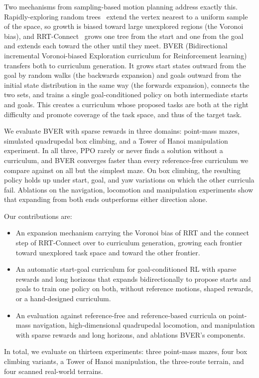 Two mechanisms from sampling-based motion planning address exactly this. Rapidly-exploring random trees~\citep[RRT;][]{lavalle2001randomized} extend the vertex nearest to a uniform sample of the space, so growth is biased toward large unexplored regions (the Voronoi bias), and RRT-Connect~\citep{kuffner2000rrt} grows one tree from the start and one from the goal and extends each toward the other until they meet. BVER (Bidirectional incremental Voronoi-biased Exploration curriculum for Reinforcement learning) transfers both to curriculum generation. It grows start states outward from the goal by random walks (the backwards expansion) and goals outward from the initial state distribution in the same way (the forwards expansion), connects the two sets, and trains a single goal-conditioned policy on both intermediate starts and goals. This creates a curriculum whose proposed tasks are both at the right difficulty and promote coverage of the task space, and thus of the target task.

We evaluate BVER with sparse rewards in three domains: point-mass mazes, simulated quadrupedal box climbing, and a Tower of Hanoi manipulation experiment. In all three, PPO rarely or never finds a solution without a curriculum, and BVER converges faster than every reference-free curriculum we compare against on all but the simplest maze. On box climbing, the resulting policy holds up under start, goal, and yaw variations on which the other curricula fail. Ablations on the navigation, locomotion and manipulation experiments show that expanding from both ends outperforms either direction alone.

Our contributions are:
\begin{itemize}[leftmargin=16pt, topsep=0.0em]
    \item An expansion mechanism carrying the Voronoi bias of RRT and the connect step of RRT-Connect over to curriculum generation, growing each frontier toward unexplored task space and toward the other frontier.
    \item An automatic start-goal curriculum for goal-conditioned RL with sparse rewards and long horizons that expands bidirectionally to propose starts and goals to train one policy on both, without reference motions, shaped rewards, or a hand-designed curriculum.
    \item An evaluation against reference-free and reference-based curricula on point-mass navigation, high-dimensional quadrupedal locomotion, and manipulation with sparse rewards and long horizons, and ablations BVER's components.
\end{itemize}
In total, we evaluate on thirteen experiments: three point-mass mazes, four box climbing variants, a Tower of Hanoi manipulation, the three-route terrain, and four scanned real-world terrains.
